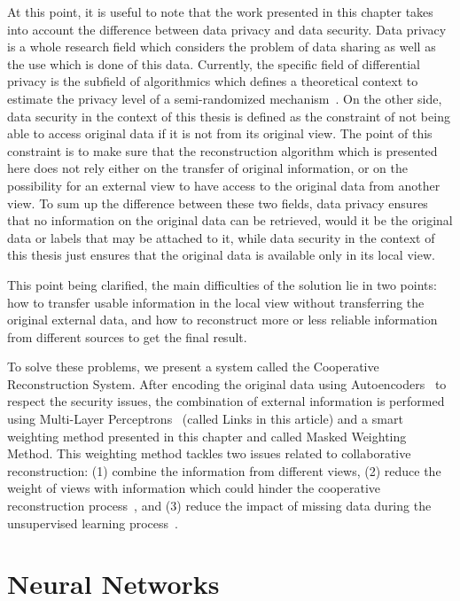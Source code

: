 At this point, it is useful to note that the work presented in this chapter takes into account the difference between data privacy and data security. Data privacy is a whole research field which considers the problem of data sharing as well as the use which is done of this data. Currently, the specific field of differential privacy is the subfield of algorithmics which defines a theoretical context to estimate the privacy level of a semi-randomized mechanism~\cite{dwork2010differential}. On the other side, data security in the context of this thesis is defined as the constraint of not being able to access original data if it is not from its original view. The point of this constraint is to make sure that the reconstruction algorithm which is presented here does not rely either on the transfer of original information, or on the possibility for an external view to have access to the original data from another view. To sum up the difference between these two fields, data privacy ensures that no information on the original data can be retrieved, would it be the original data or labels that may be attached to it, while data security in the context of this thesis just ensures that the original data is available only in its local view.

This point being clarified, the main difficulties of the solution lie in two points: how to transfer usable information in the local view without transferring the original external data, and how to reconstruct more or less reliable information from different sources to get the final result.

To solve these problems, we present a system called the Cooperative Reconstruction System. After encoding the original data using Autoencoders~\cite{hinton2006reducing} to respect the security issues, the combination of external information is performed using Multi-Layer Perceptrons~\cite{rumelhart1985learning} (called Links in this article) and a smart weighting method presented in this chapter and called Masked Weighting Method. This weighting method tackles two issues related to collaborative reconstruction: (1) combine the information from different views, (2) reduce the weight of views with information which could hinder the cooperative reconstruction process~\cite{sublime2018youpi}, and (3) reduce the impact of missing data during the unsupervised learning process~\cite{DBLP:journals/bmcbi/SoutoJC15}.


\section{Neural Networks}
\label{sec:nn}

